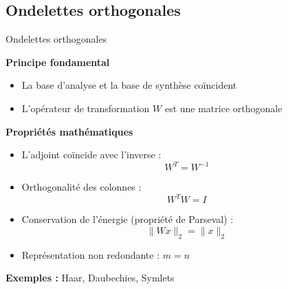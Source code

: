 \subsection{Ondelettes orthogonales}
\begin{frame}{Ondelettes orthogonales}

    \textbf{Principe fondamental}
    \begin{itemize}
        \item La base d'analyse et la base de synthèse coïncident
        \item L'opérateur de transformation $W$ est une matrice orthogonale
    \end{itemize}

    \textbf{Propriétés mathématiques}
    \begin{itemize}
        \item L'adjoint coïncide avec l'inverse :
        \[
        W^T = W^{-1}
        \]
        \item Orthogonalité des colonnes :
        \[
        W^T W = I
        \]
        \item Conservation de l'énergie (propriété de Parseval) :
        \[
        \|Wx\|_2 = \|x\|_2
        \]
        \item Représentation non redondante : $m = n$
    \end{itemize}
    \textbf{Exemples :} Haar, Daubechies, Symlets

\end{frame}



